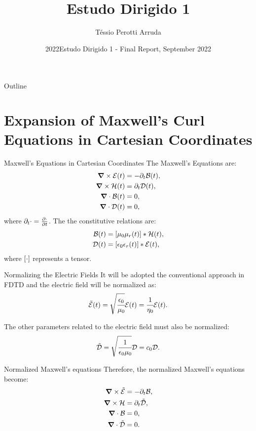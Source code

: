 \documentclass{beamer}
\title{Estudo Dirigido 1}
\author{Téssio Perotti Arruda}
\institute{UnB}
\date{2022}
\institute[UnB] %
{
  \inst{1}%
  Electrical Engineering\\
  University of Brasilia
}
\date[ED1 2022.1] %
{Estudo Dirigido 1 - Final Report, September 2022}
\begin{document}
\frame{\titlepage}

\begin{frame}{Outline}
  \tableofcontents
\end{frame}


\section{Expansion of Maxwell's Curl Equations in Cartesian Coordinates}

\begin{frame}{Maxwell's Equations in Cartesian Coordinates}
The Maxwell's Equations are:
\begin{align*}
    \bm{\nabla}\times \mathcal{E}(t) &= -\partial _t \mathcal{B}(t), \\
    \bm{\nabla}\times \mathcal{H}(t) &= \partial_t \mathcal{D}(t), \\
    \bm{\nabla}\cdot \mathcal{B}(t) &= 0, \\
    \bm{\nabla}\cdot \mathcal{D}(t) &= 0,
\end{align*}
where $\partial_t\cdot = \frac{\partial \cdot}{\partial t}$.
The the constitutive relations are:
\begin{align}
    \Bt(t) &= \brackets{\mu_0\mu_r  (t)} \ast \Hht(t), \\
    \Dt(t) &= \brackets{\epsilon_0 \epsilon_r  (t)} \ast \Et(t),
\end{align}
where $\brackets{\cdot}$ represents a tensor.
\end{frame}


\begin{frame}{Normalizing the Electric Fields}
  It will be adopted the conventional approach in FDTD and the electric field will be normalized as:
  \begin{equation}
    \tilde{\mathcal{E}}(t) = \sqrt{\cfrac{\epsilon_0}{\mu_0}}\mathcal{E}(t) = \cfrac{1}{\eta_0}\mathcal{E}(t).
  \end{equation}

  The other parameters related to the electric field must also be normalized:
  \begin{equation}
      \tilde{\mathcal{D}} = \sqrt{\cfrac{1}{\epsilon_0\mu_0}} \mathcal{D} = c_0 \mathcal{D}.
  \end{equation}

\end{frame}

\begin{frame}{Normalized Maxwell's equations}
  Therefore, the normalized Maxwell's equations become:
  \begin{align}
      \bm{\nabla}\times \tilde{\mathcal{E}} &= -\partial _t \mathcal{B}, \\
      \bm{\nabla}\times \mathcal{H} &= \partial_t \tilde{\mathcal{D}}, \\
      \bm{\nabla}\cdot \mathcal{B} &= 0, \\
      \bm{\nabla}\cdot \tilde{\mathcal{D}} &= 0.
  \end{align}
\end{frame}
\end{document}
